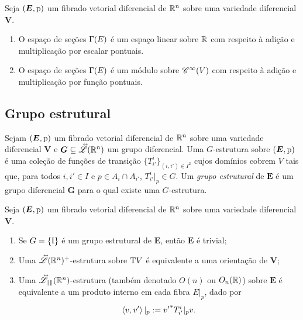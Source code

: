 \begin{exercise}
Seja $(\bm E,\mathrm{p})$ um fibrado vetorial diferencial de $\mathbb{R}^n$ sobre uma variedade diferencial $\bm V$.
	\begin{enumerate}
	\item O espaço de seções $\Gamma(E)$ é um espaço linear sobre $\mathbb{R}$ com respeito à adição e multiplicação por escalar pontuais.
	\item O espaço de seções $\Gamma(E)$ é um módulo sobre $\mathscr{C}^\infty(V)$ com respeito à adição e multiplicação por função pontuais.
	\end{enumerate}
\end{exercise}


\subsection{Grupo estrutural}

\begin{definition}
Sejam $(\bm E,\mathrm{p})$ um fibrado vetorial diferencial de $\mathbb{R}^n$ sobre uma variedade diferencial $\bm V$ e $\bm G \subseteq \accentset{\leftrightarrow}{\mathscr{L}}(\mathbb{R}^n)$ um grupo diferencial. Uma $G$-estrutura sobre $(\bm E,\mathrm{p})$ é uma coleção de funções de transição $\{T^i_{i'}\}_{(i,i') \in I^2}$ cujos domínios cobrem $V$ tais que, para todos $i,i' \in I$ e $p \in A_i \cap A_{i'}$, $T^i_{i'}|_p \in G$. Um \emph{grupo estrutural} de $\bm E$ é um grupo diferencial $\bm G$ para o qual existe uma $G$-estrutura.
\end{definition}

\begin{example}
Seja $(\bm E,\mathrm{p})$ um fibrado vetorial diferencial de $\mathbb{R}^n$ sobre uma variedade diferencial $\bm V$.
	\begin{enumerate}
	\item Se $G=\{\mathrm{I}\}$ é um grupo estrutural de $\bm E$, então $\bm E$ é trivial;

	\item Uma $\accentset{\leftrightarrow}{\mathscr{L}}(\mathbb{R}^n)^+$-estrutura sobre $\mathrm{T} V$ é equivalente a uma orientação de $\bm V$;

	\item Uma $\accentset{\leftrightarrow}{\mathscr{L}_{\left\Vert{}\right\Vert}}(\mathbb{R}^n)$-estrutura (também denotado $O(n)$ ou  $O_n(\mathbb{R})$) sobre $\bm E$ é equivalente a um produto interno em cada fibra $E|_p$, dado por
		\begin{equation*}
		\left\langle{v},{v'}\right\rangle|_p := {v'}^* T^i_{i'}|_p v.
		\end{equation*}
	\end{enumerate}
\end{example}



